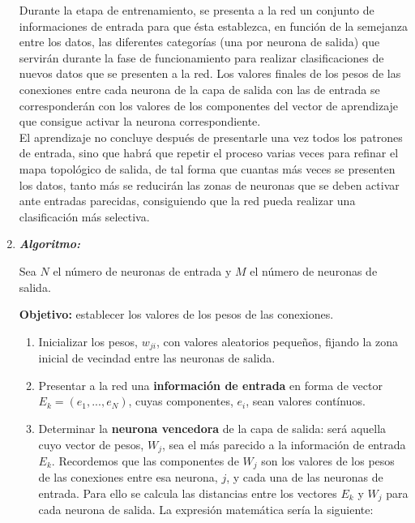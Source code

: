 \documentclass[journal]{IEEEtran}
\begin{document}
\begin{enumerate}
Durante la etapa de entrenamiento, se presenta a la red un conjunto de informaciones de entrada para que ésta establezca, en función de la semejanza entre los datos, las diferentes categorías (una por neurona de salida) que servirán durante la fase de funcionamiento para realizar clasificaciones de nuevos datos que se presenten a la red. Los valores finales de los pesos de las conexiones entre cada neurona de la capa de salida con las de entrada se corresponderán con los valores de los componentes del vector de aprendizaje que consigue activar la neurona correspondiente.\\

El aprendizaje no concluye después de presentarle una vez todos los patrones de entrada, sino que habrá que repetir el proceso varias veces para refinar el mapa topológico de salida, de tal forma que cuantas más veces se presenten los datos, tanto más se reducirán las zonas de neuronas que se deben activar ante entradas parecidas, consiguiendo que la red pueda realizar una clasificación más selectiva.\\
	
\item \textbf{\emph{Algoritmo:}}
	
Sea $N$ el número de neuronas de entrada y $M$ el número de neuronas de salida.

\textbf{Objetivo:} establecer los valores de los pesos de las conexiones.

\begin{enumerate}
\item Inicializar los pesos, $w_{ji}$, con valores aleatorios pequeños, fijando la zona inicial de vecindad entre las neuronas de salida.\\
    		
\item Presentar a la red una \textbf{información de entrada} en forma de vector $E_{k} = (e_{1}, ..., e_{N})$, cuyas componentes, $e_{i}$, sean valores contínuos.\\
    		
\item Determinar la \textbf{neurona vencedora} de la capa de salida: será aquella cuyo vector de pesos, $W_{j}$, sea el más parecido a la información de entrada $E_{k}$. Recordemos que las componentes de $W_{j}$ son los valores de los pesos de las conexiones entre esa neurona, $j$, y cada una de las neuronas de entrada. Para ello se calcula las distancias entre los vectores $E_{k}$ y $W_{j}$ para cada neurona de salida. La expresión matemática sería la siguiente:


\end{enumerate}
\end{enumerate}
\end{document}
